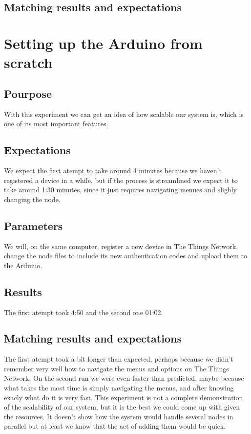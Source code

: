 	\subsection{Matching results and expectations}

\section{Setting up the Arduino from scratch}

	\subsection{Pourpose}
		With this experiment we can get an idea of how scalable our system is, which is one of its most important features.
	\subsection{Expectations}
		We expect the first atempt to take around 4 minutes because we haven't registered a device in a while, but if the process is streamlined we expect it to take around 1:30 minutes, since it just requires navigating menues and slighly changing the node.
	\subsection{Parameters}
		We will, on the same computer, register a new device in The Things Network, change the node files to include its new authentication codes and upload them to the Arduino.
	\subsection{Results}
		The first atempt took 4:50 and the second one 01:02.
	\subsection{Matching results and expectations}
		The first atempt took a bit longer than expected, perhaps because we didn't remember very well how to navigate the menus and options on The Things Network. On the second run we were even faster than predicted, maybe because what takes the most time is simply navigating the menus, and after knowing exacly what do it is very fast. This experiment is not a complete demonstration of the scalability of our system, but it is the best we could come up with given the resources. It doesn't show how the system would handle several nodes in parallel but at least we know that the act of adding them would be quick.

